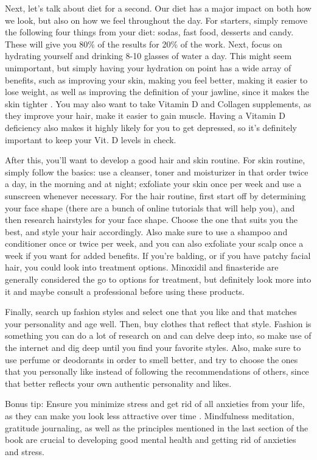 \documentclass[
]{book}
\begin{document}
Next, let's talk about diet for a second. Our diet has a major impact on both how we look, but also on how we feel throughout the day. For starters, simply remove the following four things from your diet: sodas, fast food, desserts and candy. These will give you 80\% of the results for 20\% of the work. Next, focus on hydrating yourself and drinking 8-10 glasses of water a day. This might seem unimportant, but simply having your hydration on point has a wide array of benefits, such as improving your skin, making you feel better, making it easier to lose weight, as well as improving the definition of your jawline, since it makes the skin tighter \citep{water}. You may also want to take Vitamin D and Collagen supplements, as they improve your hair, make it easier to gain muscle. Having a Vitamin D deficiency also makes it highly likely for you to get depressed, so it's definitely important to keep your Vit. D levels in check.

After this, you'll want to develop a good hair and skin routine. For skin routine, simply follow the basics: use a cleanser, toner and moisturizer in that order twice a day, in the morning and at night; exfoliate your skin once per week and use a sunscreen whenever necessary. For the hair routine, first start off by determining your face shape (there are a bunch of online tutorials that will help you), and then research hairstyles for your face shape. Choose the one that suits you the best, and style your hair accordingly. Also make sure to use a shampoo and conditioner once or twice per week, and you can also exfoliate your scalp once a week if you want for added benefits. If you're balding, or if you have patchy facial hair, you could look into treatment options. Minoxidil and finasteride are generally considered the go to options for treatment, but definitely look more into it and maybe consult a professional before using these products.

Finally, search up fashion styles and select one that you like and that matches your personality and age well. Then, buy clothes that reflect that style. Fashion is something you can do a lot of research on and can delve deep into, so make use of the internet and dig deep until you find your favorite styles. Also, make sure to use perfume or deodorants in order to smell better, and try to choose the ones that you personally like instead of following the recommendations of others, since that better reflects your own authentic personality and likes.

Bonus tip: Ensure you minimize stress and get rid of all anxieties from your life, as they can make you look less attractive over time \citep{stress}. Mindfulness meditation, gratitude journaling, as well as the principles mentioned in the last section of the book are crucial to developing good mental health and getting rid of anxieties and stress.
\end{document}
